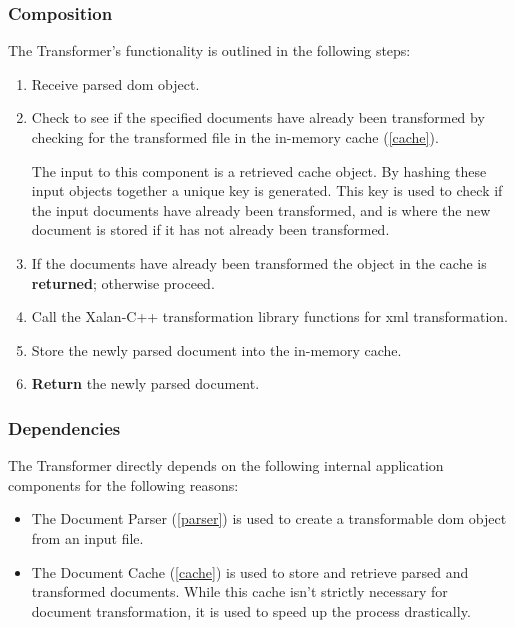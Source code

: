 \subsubsection{Composition}

The Transformer's functionality is outlined in the following steps:

\begin{enumerate}
	\item Receive parsed \gls{dom} object.
	\item {
    	Check to see if the specified documents have already been transformed by checking for the transformed file in the in-memory cache (\ref{cache}).
        
       	The input to this component is a retrieved cache object.
        By hashing these input objects together a unique key is generated.
        This key is used to check if the input documents have already been transformed, and is where the new document is stored if it has not already been transformed.
    }
    \item If the documents have already been transformed the object in the cache is \textbf{returned}; otherwise proceed.
    \item Call the Xalan-C++ transformation library functions for \gls{xml} transformation. \cite{xalan-library}
    \item Store the newly parsed document into the in-memory cache.
    \item \textbf{Return} the newly parsed document.
\end{enumerate}

\subsubsection{Dependencies}

The Transformer directly depends on the following internal application components for the following reasons:

\begin{itemize}
    \item {
    	The Document Parser (\ref{parser}) is used to create a transformable \gls{dom} object from an input file. \cite{dom-spec}
    }
	\item {
    	The Document Cache (\ref{cache}) is used to store and retrieve parsed and transformed documents.
		While this cache isn't strictly necessary for document transformation, it is used to speed up the process drastically.
    }
\end{itemize}

